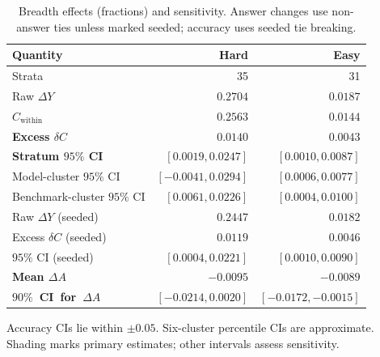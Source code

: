 \documentclass[11pt,a4paper]{article}
\theoremstyle{definition}
\newcommand{\resultcell}[1]{{\bfseries\boldmath #1}}
\begin{document}
\begin{table}[H]
\centering\footnotesize
\setlength{\tabcolsep}{3pt}
\renewcommand{\arraystretch}{1.06}
\caption{Breadth effects (fractions) and sensitivity. Answer changes use non-answer ties unless marked seeded; accuracy uses seeded tie breaking.}
\label{tab:churn-results}
\label{tab:accuracy-results}
\label{tab:tie-sensitivity}
\begin{tabularx}{\columnwidth}{@{}Zrr@{}}
\toprule
Quantity & Hard & Easy\\
\midrule
Strata & 35 & 31\\
Raw $\Delta Y$ & $0.2704$ & $0.0187$\\
$C_{\mathrm{within}}$ & $0.2563$ & $0.0144$\\
\resultcell{Excess $\delta C$} & \resultcell{$0.0140$} & \resultcell{$0.0043$}\\
\resultcell{Stratum $95\%$ CI} & \resultcell{$[0.0019, 0.0247]$} & \resultcell{$[0.0010, 0.0087]$}\\
Model-cluster $95\%$ CI & $[-0.0041, 0.0294]$ & $[0.0006, 0.0077]$\\
Benchmark-cluster $95\%$ CI & $[0.0061, 0.0226]$ & $[0.0004, 0.0100]$\\
\midrule
Raw $\Delta Y$ (seeded) & $0.2447$ & $0.0182$\\
Excess $\delta C$ (seeded) & $0.0119$ & $0.0046$\\
$95\%$ CI (seeded) & $[0.0004, 0.0221]$ & $[0.0010, 0.0090]$\\
\midrule
{}
\resultcell{Mean $\Delta A$} & \resultcell{$-0.0095$} & \resultcell{$-0.0089$}\\
\resultcell{\mbox{$90\%$ CI for $\Delta A$}} & \resultcell{$[-0.0214, 0.0020]$} & \resultcell{$[-0.0172, -0.0015]$}\\
\bottomrule
\end{tabularx}
\par\smallskip
\begin{minipage}{\columnwidth}\footnotesize
Accuracy CIs lie within $\pm0.05$. Six-cluster percentile CIs are approximate. Shading marks primary estimates; other intervals assess sensitivity.
\end{minipage}
\end{table}
\end{document}

